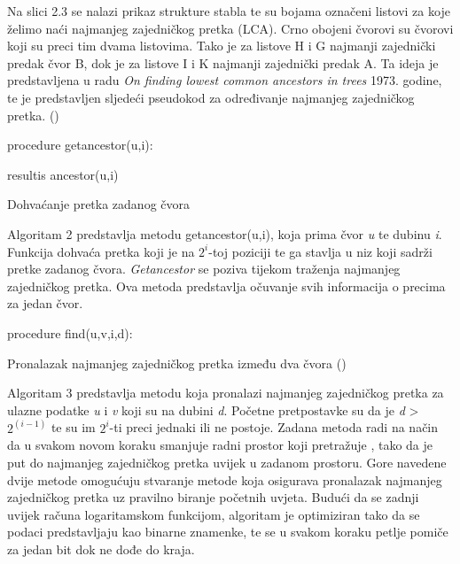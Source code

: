 \documentclass[times, utf8, zavrsni]{fer}
\begin{document}
Na slici 2.3 se nalazi prikaz strukture stabla te su bojama označeni listovi za koje želimo naći najmanjeg zajedničkog pretka (LCA). Crno obojeni čvorovi su čvorovi koji su preci tim dvama listovima. Tako je za listove H i G najmanji zajednički predak čvor B, dok je za listove I i K najmanji zajednički predak A. Ta ideja je predstavljena u radu \textit{On finding lowest common ancestors in trees} 1973. godine, te je predstavljen sljedeći pseudokod za određivanje najmanjeg zajedničkog pretka. (\cite{lca1,lca2,lca3})
\newline
\newline
\begin{algorithm}[H]
	
	
	procedure getancestor(u,i):

	
		resultis ancestor(u,i)\;
	\caption{Dohvaćanje pretka zadanog čvora \cite{lca1}}
	\label{LCA algoritam 1}
\end{algorithm}

Algoritam 2 predstavlja metodu getancestor(u,i), koja prima čvor \textit{u} te dubinu \textit{i}. Funkcija dohvaća pretka koji je na $2^i$-toj poziciji te ga stavlja u niz koji sadrži pretke zadanog čvora. \textit{Getancestor} se poziva tijekom traženja najmanjeg zajedničkog pretka. Ova metoda predstavlja očuvanje svih informacija o precima za jedan čvor. 
\newline
\begin{algorithm}[H]

		procedure find(u,v,i,d):\\
	\caption{Pronalazak najmanjeg zajedničkog pretka između dva čvora (\cite{lca1})}
	\label{LCA algorithm 2}
	
\end{algorithm}

Algoritam 3 predstavlja metodu koja pronalazi najmanjeg zajedničkog pretka za ulazne podatke \textit{u} i \textit{v} koji su na dubini \textit{d}. Početne pretpostavke su da je \textit{d} > $2^{(i-1)}$ te su im $2^i$-ti preci jednaki ili ne postoje. Zadana metoda radi na način da u svakom novom koraku smanjuje radni prostor koji pretražuje , tako da je put do najmanjeg zajedničkog pretka uvijek u zadanom prostoru. Gore navedene dvije metode omogućuju stvaranje metode koja osigurava pronalazak najmanjeg zajedničkog pretka uz pravilno biranje početnih uvjeta. Budući da se zadnji uvijek računa logaritamskom funkcijom, algoritam je optimiziran tako da se podaci predstavljaju kao binarne znamenke, te se u svakom koraku petlje pomiče za jedan bit dok ne dođe do kraja.
\end{document}
